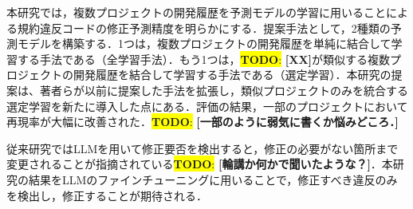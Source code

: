 \documentclass[submit]{ipsj}
\newcommand{\todo}[1]{\colorbox{yellow}{{\bf TODO}:}{\color{red} {\textbf{[#1]}}}}
\begin{document}

本研究では，複数プロジェクトの開発履歴を予測モデルの学習に用いることによる規約違反コードの修正予測精度を明らかにする．提案手法として，2種類の予測モデルを構築する．1つは，複数プロジェクトの開発履歴を単純に結合して学習する手法である（全学習手法）．もう1つは，\todo{XX}が類似する複数プロジェクトの開発履歴を結合して学習する手法である（選定学習）．本研究の提案は、著者らが以前に提案した手法\cite{mine}\cite{mine_live}を拡張し，類似プロジェクトのみを統合する選定学習を新たに導入した点にある．評価の結果，一部のプロジェクトにおいて再現率が大幅に改善された．\todo{一部のように弱気に書くか悩みどころ．}

従来研究ではLLMを用いて修正要否を検出すると，修正の必要がない箇所まで変更されることが指摘されている\todo{輪講か何かで聞いたような？}．本研究の結果をLLMのファインチューニングに用いることで，修正すべき違反のみを検出し，修正することが期待される．

\end{document}
